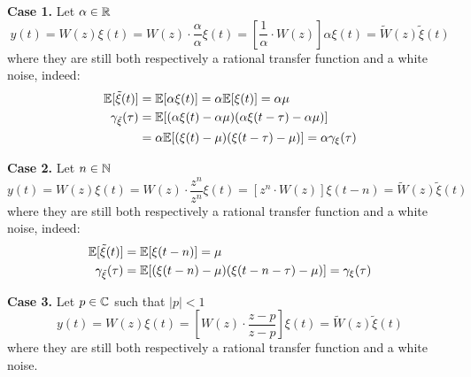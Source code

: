 \textbf{Case 1.}
Let $\alpha \in \mathbb{R}$
\[
	y(t)=W(z) \xi(t)=W(z) \cdot \frac{\alpha}{\alpha} \xi(t)=\left[\frac{1}{\alpha} \cdot W(z)\right] \alpha \xi(t)=\tilde{W}(z) \tilde{\xi}(t)
\]
where they are still both respectively a rational transfer function and a white noise, indeed:
\begin{align*}
	\mathbb{E}[\tilde{\xi}(t)]&=\mathbb{E}[\alpha \xi(t)]=\alpha \mathbb{E}[\xi(t)]=\alpha \mu\\
	\gamma_{\tilde{\xi}}(\tau)&=\mathbb{E}[(\alpha\xi(t)-\alpha\mu)(\alpha \xi(t-\tau)-\alpha \mu)]\\
	&=\alpha \mathbb{E}[(\xi(t)-\mu)( \xi(t-\tau)- \mu)] = \alpha \gamma_{\xi}(\tau)
\end{align*}

\textbf{Case 2.}
Let $n \in \mathbb{N}$
\[
	y(t)=W(z) \xi(t)=W(z) \cdot \frac{z^{n}}{z^{n}} \xi(t)=\left[z^{n} \cdot W(z)\right] \xi(t-n)=\tilde{W}(z) \tilde{\xi}(t)
\]
where they are still both respectively a rational transfer function and a white noise, indeed:
\begin{align*}
	\mathbb{E}[\tilde{\xi}(t)]&=\mathbb{E}[\xi(t-n)]=\mu \\
	\gamma_{\tilde{\xi}}(\tau)&=\mathbb{E}[(\xi(t-n)-\mu)(\xi(t-n-\tau)-\mu)]=\gamma_{\xi}(\tau)
\end{align*}

\textbf{Case 3.}
Let $p \in \mathbb{C}$ such that $|p|<1$
\[
	y(t)=W(z) \xi(t)=\left[W(z) \cdot \frac{z-p}{z-p}\right] \xi(t)=\tilde{W}(z) \tilde{\xi}(t)
\]
where they are still both respectively a rational transfer function and a white noise.

